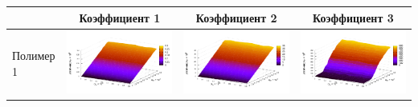 \documentclass[11pt,a4paper]{article}
\theoremstyle{definition}
\begin{document}
\begin{table}[h]
  \centering
  \footnotesize
  \begin{tabular}{l | c c c}
	  & Коэффициент 1 & Коэффициент 2 & Коэффициент 3 \\ \hline
	\begin{rotate}{90}Полимер 1\end{rotate} &	\includegraphics[scale=0.4]{figs/even/p1.txt_coeff0.dat.pdf} & \includegraphics[scale=0.4]{figs/even/p1.txt_coeff1.dat.pdf} & \includegraphics[scale=0.4]{figs/even/p1.txt_coeff2.dat.pdf} \\

\end{tabular}
\end{table}
\end{document}
